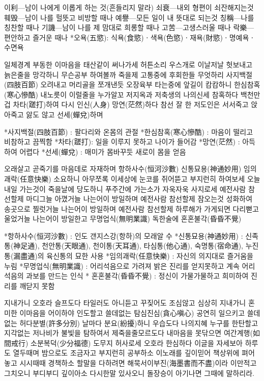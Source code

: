 \documentclass[12pt, a4paper, oneside]{book}
\begin{document}
           이利---남이 나에게 이롭게 하는 것(흔들리지 말라)
           쇠衰---내외 형편이 쇠잔해지는것
           훼毁---남이 나를 헐뜻고 비방할 때나
           예譽---모든 일이 내 뜻대로 되는것
           칭稱---나를 칭찬할 때나
           기譏---남이 나를 제 맘대로 희롱할 때나
           고苦---고생스러울 때나 
           락樂---편안하고 즐거운 때나
 *오욕(五慾): 식욕(食慾)ㆍ색욕(色慾)ㆍ재욕(財慾)ㆍ명예욕ㆍ수면욕

  

일체경계 부동한 이마음을 태산같이 써나가세 허튼소리 우스개로 이날저날 헛보내고 늙은줄을 망각하니 무슨공부 하여볼까 죽을제 고통중에 후회한들 무엇하리 사지백절(四肢百節) 오려내고 머리골을 쪼개낸듯 오장육부 타는중에 앞길이 캄캄하니 한심참혹(寒心慘酷) 내노릇이 이럴줄을 누가알꼬 저지옥과 저축생의 나의신세 참혹하다 백천만겁 차타(蹉打)하여 다시 인신(人身) 망연(茫然)하다 참선 잘 한 저도인은 서서죽고 앉아죽고 앓도 않고 선세(蟬兌)하며

 

*사지백절(四肢百節) : 팔다리와 온몸의 관절
*한심참혹(寒心慘酷) : 마음이 떨리고 비참하고 끔찍함
*차타(蹉打): 일을 이루지 못하고 나이가 들어감
*망연(茫然) :  아득하여 어렵다         
*선세(蟬兌) : 매미가 몸바꾸듯 새로이 몸을 얻음

 

오래살고 곧죽기를 마음데로 자재하며 항하사수(恒河沙數) 신통묘용(神通妙用) 임의괘락(任意快樂) 소요하니 아무쪼록 이세상에 눈코를 쥐어뜯고 부지런히
하여보세 오늘내일 가는것이 죽을날에 당도하니 푸주간에 가는소가
자욱자욱 사지로세 예전사람 참선할제 마디그늘 아꼈거늘 나는어이
방일하며 예전사람 참선할제 잠오는것 성화하여 송곳으로 찔럿거늘
나는어이 방일하며 예전사람 참선할제 하루해가 가게되면 다리뻗고 울었거늘 나는어이 방일한고 무명업식(無明業識) 독한술에 혼혼불각(昏昏不覺)

 

*항하사수(恒河沙數) : 인도 갠지스강(항하)의 모래알 수
*신통묘용(神通妙用) : 신족통(神足通), 천안통(天眼通), 천이통(天耳通), 타심통(他心通), 숙명통(宿命通), 누진통(漏盡通)의 육신통의 묘한 사용
*임의괘락(任意快樂) : 자신의 의지대로 즐거움을 누림
*무명업식(無明業識) : 어리석음으로 가려져 밝은 진리를 얻지못하고 계속 어리석음의 과보를 만드는 인식
* 혼혼불각(昏昏不覺) : 정신이 가물가물하고 희미하여 진리를 깨닫지 못함

 

지내가니 오호라 슬프도다 타일러도 아니듣고 꾸짖어도 조심않고 심상히 지내가니 혼미한 이마음을 어이하야 인도할고 쓸데없는 탐심진심(貪心嗔心) 공연히 일으키고 쓸데없는 허다분별(許多分別) 날마다 분요(紛擾)하니 우습도다 나의지혜 누구를 한탄할고 지각없는 저나비가 불빛을 탐하여서 제죽을줄모르도다 내마음을 못닦으면 여간계행(如間戒行) 소분복덕(少分福德) 도무지 허사로세 오호라 한심하다 이글을 자세보아 하루도 열두때며 밤으로도 조금자고 부지런히 공부하소 이노래를 깊이믿어 책상위에 펴어놓고 시시때때 경책하소 할말을 다하려면 해묵서이부진(海墨書而不盡)이라 이만적고 그치오니 부디부디 깊이아소 다시한말 있사오니 돌장승이 아기나면 그때에 말하리라.
\end{document}
